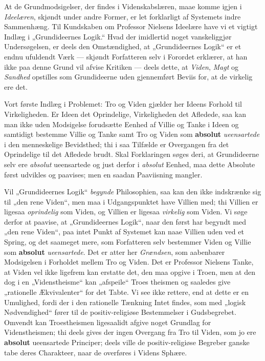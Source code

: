 \documentclass[12pt,a4paper]{book}
\newcommand{\opage}[1]{\marginnote{\footnotesize\textit{[#1]}}}
\begin{document}
At de Grundmodsigelser, der findes i Videnskabslæren,
maae komme igjen i \emph{Ideelæren}, skjøndt under
andre Former, er let forklarligt af Systemets indre
Sammenhæng. Til Kundskaben om Professor Nielsens
Ideelære have vi et vigtigt Indlæg i „Grundideernes
Logik.“ Hvad der imidlertid noget vanskeliggjør Undersøgelsen,
er deels den Omstændighed, at „Grundideernes
Logik“ er et endnu ufuldendt Værk --- skjøndt Forfatteren
\opage{8}\setcounter{footnote}{0}%
selv i Forordet erklærer, at han ikke paa denne Grund vil
afvise Kritiken --- deels dette, at \emph{Viden}, \emph{Magt} og
\emph{Sandhed} opstilles som Grundideerne uden gjennemført
Beviis for, at de virkelig ere det.

Vort første Indlæg i Problemet: Tro og Viden
gjælder her Ideens Forhold til Virkeligheden. Er Ideen
det Oprindelige, Virkeligheden det Afledede, saa kan man
ikke uden Modsigelse forudsætte Eenhed af Villie og
Tanke i Ideen og samtidigt bestemme Villie og Tanke
samt Tro og Viden som \textbf{absolut} \emph{ueensartede} i den
menneskelige Bevidsthed; thi i saa Tilfælde er Overgangen
fra det Oprindelige til det Afledede brudt. Skal
Forklaringen søges deri, at Grundideerne selv ere \emph{absolut}
ueensartede og just derfor i \emph{absolut} Eenhed,
maa dette Absolute først udvikles og paavises; men en
saadan Paaviisning mangler.

Vil „Grundideernes Logik“ \emph{begynde} Philosophien,
saa kan den ikke indskrænke sig til „den rene Viden“, men maa
i Udgangspunktet have Villien med; thi Villien er ligesaa
\emph{oprindelig} som Viden, og Villien er ligesaa \emph{virkelig}
som Viden. Vi søge derfor at paavise, at „Grundideernes
Logik“, naar den først har begyndt med „den rene Viden“,
paa intet Punkt af Systemet kan naae Villien
uden ved et Spring, og det saameget mere, som Forfatteren
selv bestemmer Viden og Villie som \textbf{absolut}
\emph{ueensartede}. Det er atter her \emph{Grændsen}, som aabenbarer
Modsigelsen i Forholdet mellem Tro og Viden.
Det er Professor Nielsens Tanke, at Viden vel ikke
ligefrem kan erstatte det, den maa opgive i Troen, men
at den dog i en „Videnstheisme“ kan „afspeile“ Troes%
\opage{9}\setcounter{footnote}{0}%
theismen og saaledes give „rationelle Ækvivalenter“ for
det Tabte. Vi see ikke rettere, end at dette er en Umulighed,
fordi der i den rationelle Tænkning Intet findes,
som med „logisk Nødvendighed“ fører til de positiv-religiøse
Bestemmelser i Gudsbegrebet. Omvendt kan
Troestheismen ligesaalidt afgive noget Grundlag for
Videnstheismen; thi deels gives der ingen Overgang fra
Tro til Viden, som jo ere \textbf{absolut} ueensartede Principer;
deels ville de positiv-religiøse Begreber ganske
tabe deres Charakteer, naar de overføres i Videns
Sphære.
\end{document}
